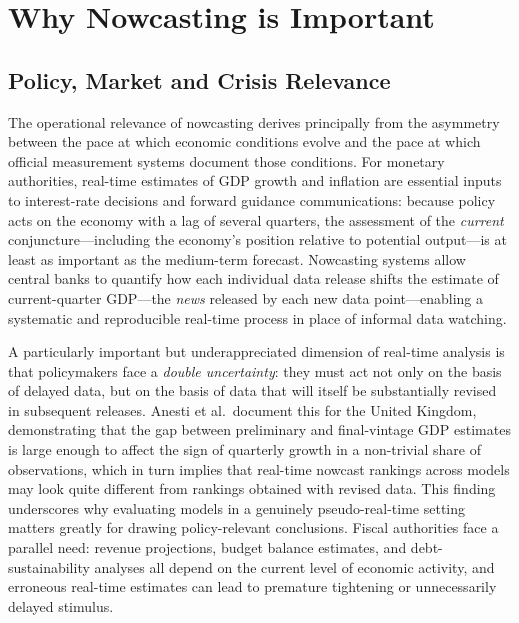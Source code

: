 \documentclass[12pt,a4paper]{report}
\begin{document}
\chapter{Why Nowcasting is Important}

\section{Policy, Market and Crisis Relevance}

The operational relevance of nowcasting derives principally from the
asymmetry between the pace at which economic conditions evolve and the
pace at which official measurement systems document those conditions.
For monetary authorities, real-time estimates of GDP growth and
inflation are essential inputs to interest-rate decisions and forward
guidance communications: because policy acts on the economy with a lag
of several quarters, the assessment of the \textit{current}
conjuncture---including the economy's position relative to potential
output---is at least as important as the medium-term forecast.
Nowcasting systems allow central banks to quantify how each individual
data release shifts the estimate of current-quarter GDP---the
\textit{news} released by each new data point---enabling a systematic
and reproducible real-time process in place of informal data
watching.\citep{Giannone2008}

A particularly important but underappreciated dimension of real-time
analysis is that policymakers face a \textit{double uncertainty}: they
must act not only on the basis of delayed data, but on the basis of data
that will itself be substantially revised in subsequent releases. Anesti
et al.\ document this for the United Kingdom, demonstrating that the
gap between preliminary and final-vintage GDP estimates is large enough
to affect the sign of quarterly growth in a non-trivial share of
observations, which in turn implies that real-time nowcast rankings
across models may look quite different from rankings obtained with
revised data.\citep{Anesti2020} This finding underscores why evaluating
models in a genuinely pseudo-real-time setting matters greatly for
drawing policy-relevant conclusions. Fiscal authorities face a parallel
need: revenue projections, budget balance estimates, and
debt-sustainability analyses all depend on the current level of economic
activity, and erroneous real-time estimates can lead to premature
tightening or unnecessarily delayed stimulus.
\end{document}
